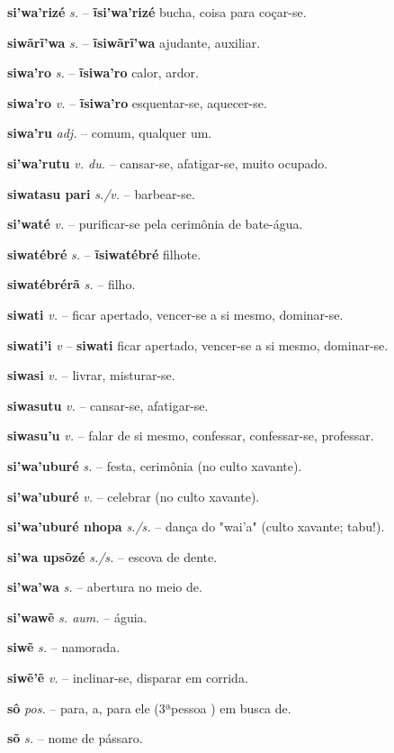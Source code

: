 \textbf{si'wa'rizé} \textit{s.} -- \textbf{ĩsi'wa'rizé} bucha, coisa para coçar-se.

\textbf{siwãrĩ'wa} \textit{s.} -- \textbf{ĩsiwãrĩ'wa} ajudante, auxiliar.

\textbf{siwa'ro} \textit{s.} -- \textbf{ĩsiwa'ro} calor, ardor.

\textbf{siwa'ro} \textit{v.} -- \textbf{ĩsiwa'ro} esquentar-se, aquecer-se.

\textbf{siwa'ru} \textit{adj.} -- comum, qualquer um.

\textbf{si'wa'rutu} \textit{v. du.} -- cansar-se, afatigar-se, muito ocupado.

\textbf{siwatasu pari} \textit{s./v.} -- barbear-se.

\textbf{si'waté} \textit{v.} -- purificar-se pela cerimônia de bate-água.

\textbf{siwatébré} \textit{s.} -- \textbf{ĩsiwatébré} filhote.

\textbf{siwatébrérã} \textit{s.} -- filho.

\textbf{siwati} \textit{v.} -- ficar apertado, vencer-se a si mesmo, dominar-se.

\textbf{siwati'i} \textit{v} -- \textbf{siwati} ficar apertado, vencer-se a si mesmo, dominar-se.

\textbf{siwasi} \textit{v.} -- livrar, misturar-se.

\textbf{siwasutu} \textit{v.} -- cansar-se, afatigar-se.

\textbf{siwasu'u} \textit{v.} -- falar de si mesmo, confessar, confessar-se, professar.

\textbf{si'wa'uburé} \textit{s.} -- festa, cerimônia (no culto xavante).

\textbf{si'wa'uburé} \textit{v.} -- celebrar (no culto xavante).

\textbf{si'wa'uburé nhopa} \textit{s./s.} -- dança do "wai'a" (culto xavante; tabu!).

\textbf{si'wa upsõzé} \textit{s./s.} -- escova de dente.

\textbf{si'wa'wa} \textit{s.} -- abertura no meio de.

\textbf{si'wawẽ} \textit{s. aum.} -- águia.

\textbf{siwẽ} \textit{s.} -- namorada.

\textbf{siwẽ'ẽ} \textit{v.} -- inclinar-se, disparar em corrida.

\textbf{sô} \textit{pos.} -- para, a, para ele (3ªpessoa ) em busca de.

\textbf{sõ} \textit{s.} -- nome de pássaro.

